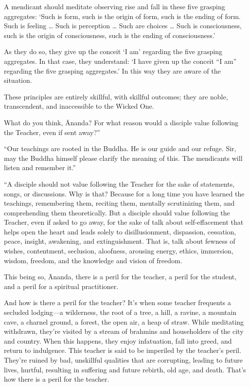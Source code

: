 \documentclass[12pt,openany]{book}%
\begin{document}
A mendicant should meditate observing rise and fall in these five grasping aggregates: ‘Such is form, such is the origin of form, such is the ending of form. Such is feeling … Such is perception … Such are choices … Such is consciousness, such is the origin of consciousness, such is the ending of consciousness.’ 

As they do so, they give up the conceit ‘I am’ regarding the five grasping aggregates. In that case, they understand: ‘I have given up the conceit “I am” regarding the five grasping aggregates.’ In this way they are aware of the situation. 

These principles are entirely skillful, with skillful outcomes; they are noble, transcendent, and inaccessible to the Wicked One. 

What do you think, Ānanda? For what reason would a disciple value following the Teacher, even if sent away?” 

“Our teachings are rooted in the Buddha. He is our guide and our refuge. Sir, may the Buddha himself please clarify the meaning of this. The mendicants will listen and remember it.” 

“A disciple should not value following the Teacher for the sake of statements, songs, or discussions. Why is that? Because for a long time you have learned the teachings, remembering them, reciting them, mentally scrutinizing them, and comprehending them theoretically. But a disciple should value following the Teacher, even if asked to go away, for the sake of talk about self-effacement that helps open the heart and leads solely to disillusionment, dispassion, cessation, peace, insight, awakening, and extinguishment. That is, talk about fewness of wishes, contentment, seclusion, aloofness, arousing energy, ethics, immersion, wisdom, freedom, and the knowledge and vision of freedom. 

This being so, Ānanda, there is a peril for the teacher, a peril for the student, and a peril for a spiritual practitioner. 

And how is there a peril for the teacher? It’s when some teacher frequents a secluded lodging—a wilderness, the root of a tree, a hill, a ravine, a mountain cave, a charnel ground, a forest, the open air, a heap of straw. While meditating withdrawn, they’re visited by a stream of brahmins and householders of the city and country. When this happens, they enjoy infatuation, fall into greed, and return to indulgence. This teacher is said to be imperiled by the teacher’s peril. They’re ruined by bad, unskillful qualities that are corrupting, leading to future lives, hurtful, resulting in suffering and future rebirth, old age, and death. That’s how there is a peril for the teacher. 
\end{document}

